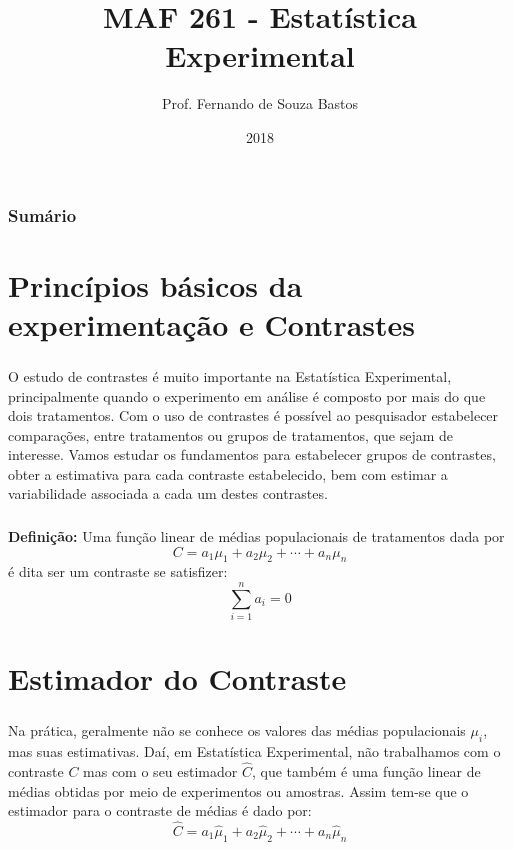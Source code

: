 \documentclass[14pt,aspectratio=1610]{beamer}
\title{MAF 261 - Estatística Experimental}
\author{Prof. Fernando de Souza Bastos}
\institute{Instituto de Ciências Exatas e Tecnológicas\texorpdfstring{\\ Universidade Federal de Viçosa}{}\texorpdfstring{\\ Campus UFV - Florestal}{}}
\date{2018}
\begin{document}


\frame{\titlepage}

\begin{frame}{}
\frametitle{\bf Sumário}
\tableofcontents
\end{frame}

\section{Princípios básicos da experimentação e Contrastes}
\begin{frame}{}
\frametitle{}
\begin{block}{}
\justifying
O estudo de contrastes é muito importante na Estatística Experimental, principalmente quando o experimento em análise é composto por mais do que dois tratamentos. Com o uso de contrastes é possível ao pesquisador estabelecer comparações, entre tratamentos ou grupos de tratamentos, que sejam de interesse. Vamos estudar os fundamentos para estabelecer grupos de contrastes, obter a estimativa para cada contraste estabelecido, bem com estimar a variabilidade associada a cada um destes contrastes. 
\end{block}
\end{frame}

\begin{frame}{}
\frametitle{}
\begin{block}{}
\justifying
 {\bf Definição:} Uma função linear de médias populacionais de tratamentos dada por $$C=a_{1}\mu_{1}+a_{2}\mu_{2}+\cdots+a_{n}\mu_{n}$$ é dita ser um contraste se satisfizer:
$${\displaystyle \sum_{i=1}^{n}a_{i}=0}$$ 
\end{block}
\end{frame}

\section{Estimador do Contraste}
\begin{frame}{}
\frametitle{}
\begin{block}{}
\justifying
Na prática, geralmente não se conhece os valores das médias populacionais $\mu_{i}$,
mas suas estimativas. Daí, em Estatística Experimental, não trabalhamos com o contraste
$C$ mas com o seu estimador $\hat{C}$, que também é uma função linear de médias obtidas por meio de experimentos ou amostras. Assim tem-se que o estimador para o contraste de
médias é dado por: 
$$\hat{C}=a_{1}\hat{\mu}_{1}+a_{2}\hat{\mu}_{2}+\cdots+a_{n}\hat{\mu}_{n}$$
\end{block}
\end{frame}
\end{document}
